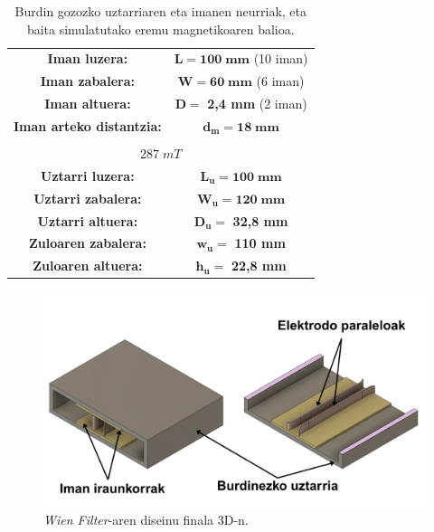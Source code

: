 \documentclass[12pt]{article}
\numberwithin{figure}{section}
\numberwithin{equation}{section}
\begin{document}
\begin{table}[h]
    \centering
    \caption{Burdin gozozko uztarriaren eta imanen neurriak, eta baita simulatutako eremu magnetikoaren balioa.}
    \begin{tabular}{cc}
        \toprule
        \textbf{Iman luzera:} & $\mathbf{L=100\;mm}$ (10 iman)\\
        \textbf{Iman zabalera:} & $\mathbf{W=60\;mm}$ (6 iman)\\
        \textbf{Iman altuera:} & $\mathbf{D=}$ \textbf{2,4 mm} (2 iman)\\
        \textbf{Iman arteko distantzia:} & $\mathbf{d_m=18\;mm}$ \\
        \midrule
        \rowcolor{gray!20}
        \multicolumn{2}{c}{$B_{simulazio}$} \\
        \midrule
        \multicolumn{2}{c}{$\num{287}\;mT$} \\
        \midrule
        \textbf{Uztarri luzera:} & $\mathbf{L_u=100\;mm}$\\
        \textbf{Uztarri zabalera:} & $\mathbf{W_u=120\;mm}$\\
        \textbf{Uztarri altuera:} & $\mathbf{D_u=}$ \textbf{32,8 mm}\\
        \textbf{Zuloaren zabalera:} & $\mathbf{w_u=}$ \textbf{110 mm} \\
        \textbf{Zuloaren altuera:} & $\mathbf{h_u=}$ \textbf{22,8 mm} \\
        \bottomrule
    \end{tabular}
    \label{tab:uztarri_magnetiko}
\end{table}
\begin{figure}[h]
    \centering
    \includegraphics[width=0.9\linewidth]{4 - Diseinua/wien_filter_final1.png}
    \caption{\textit{Wien Filter}-aren diseinu finala 3D-n.}
    \label{fig:wien_final_1}
\end{figure}
\end{document}
